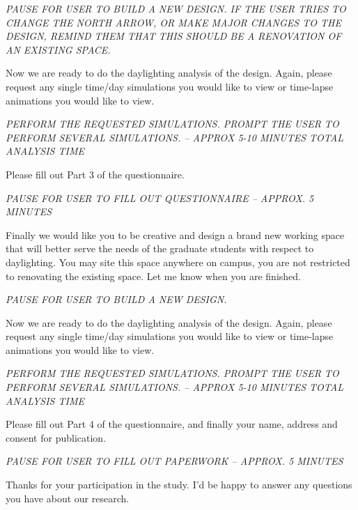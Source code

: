 \documentclass[12pt]{article}
\begin{document}
{\em PAUSE FOR USER TO BUILD A NEW DESIGN.  IF THE USER TRIES TO
  CHANGE THE NORTH ARROW, OR MAKE MAJOR CHANGES TO THE DESIGN, REMIND
  THEM THAT THIS SHOULD BE A RENOVATION OF AN EXISTING SPACE.  }

Now we are ready to do the daylighting analysis of the design.  Again,
please request any single time/day simulations you would like to view
or time-lapse animations you would like to view.

{\em PERFORM THE REQUESTED SIMULATIONS.  PROMPT THE USER TO PERFORM
  SEVERAL SIMULATIONS.  -- APPROX 5-10 MINUTES TOTAL ANALYSIS TIME }

Please fill out Part 3 of the questionnaire.

{\em PAUSE FOR USER TO FILL OUT QUESTIONNAIRE  --  APPROX. 5 MINUTES }

Finally we would like you to be creative and design a brand new
working space that will better serve the needs of the graduate
students with respect to daylighting.  You may site this space
anywhere on campus, you are not restricted to renovating the existing
space.  Let me know when you are finished.

{\em PAUSE FOR USER TO BUILD A NEW DESIGN. }

Now we are ready to do the daylighting analysis of the design.  Again,
please request any single time/day simulations you would like to view
or time-lapse animations you would like to view.

{\em PERFORM THE REQUESTED SIMULATIONS.  PROMPT THE USER TO PERFORM
  SEVERAL SIMULATIONS.  -- APPROX 5-10 MINUTES TOTAL ANALYSIS TIME }

Please fill out Part 4 of the questionnaire, and finally your name,
address and consent for publication.

{\em PAUSE FOR USER TO FILL OUT PAPERWORK  --  APPROX. 5 MINUTES }

Thanks for your participation in the study.  I'd be happy to answer
any questions you have about our research.  
\end{document}
